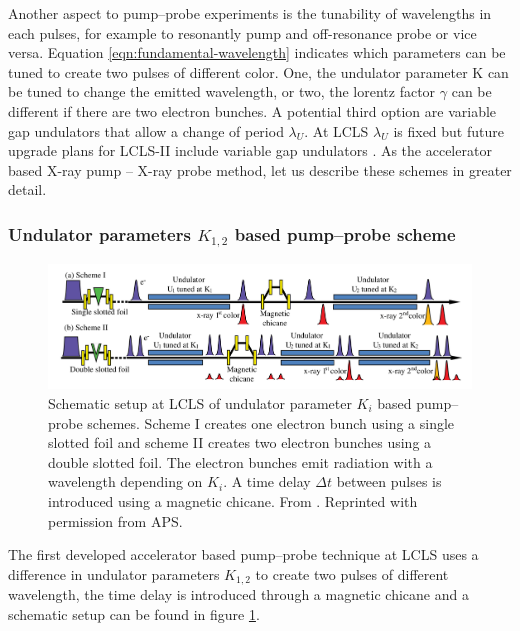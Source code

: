 Another aspect to pump--probe experiments is the tunability of wavelengths in each pulses, for example to resonantly pump and off-resonance probe or vice versa. Equation \eqref{eqn:fundamental-wavelength} indicates which parameters can be tuned to create two pulses of different color. One, the undulator parameter K can be tuned to change the emitted wavelength, or two, the lorentz factor $\gamma$ can be different if there are two electron bunches. A potential third option are variable gap undulators that allow a change of period $\lambda_{U}$. At LCLS $\lambda_{U}$ is fixed but future upgrade plans for LCLS-II include variable gap undulators \citep{Galayda-2014-IPAC}. As the accelerator based X-ray pump -- X-ray probe method, let us describe these schemes in greater detail.
%
%
%
\subsubsection{Undulator parameters $K_{1,2}$ based pump--probe scheme}
\begin{figure}
	\centering
		\includegraphics[width=1.00\textwidth]{images/Albertos-pump-probe-scheme.png}
	\caption[Schematic setup of an undulator based pump--probe scheme.]{Schematic setup at LCLS of undulator parameter $K_{i}$ based pump--probe schemes. Scheme I creates one electron bunch using a single slotted foil and scheme II creates two electron bunches using a double slotted foil. The electron bunches emit radiation with a wavelength depending on $K_{i}$. A time delay $\Delta t$ between pulses is introduced using a magnetic chicane. From \cite{Lutman-2013-PRL}. Reprinted with permission from APS.}
	\label{fig:Albertos-pump-probe-scheme}
\end{figure}
The first developed accelerator based pump--probe technique at LCLS \cite{Lutman-2013-PRL} uses a difference in undulator parameters $K_{1,2}$ to create two pulses of different wavelength, the time delay is introduced through a magnetic chicane and a schematic setup can be found in figure \ref{fig:Albertos-pump-probe-scheme}.\\

